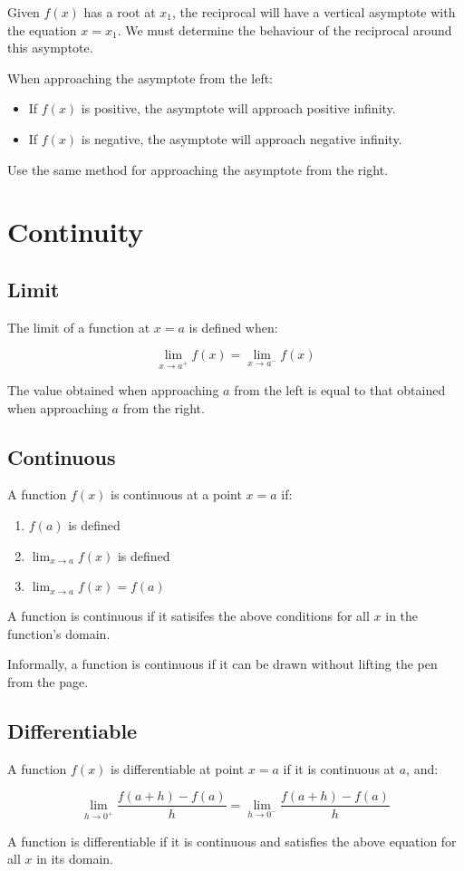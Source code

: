 \documentclass[a4paper,11pt]{article}
\begin{document}
Given $f(x)$ has a root at $x_1$, the reciprocal will have a vertical asymptote
with the equation $x = x_1$.
We must determine the behaviour of the reciprocal around this asymptote.

When approaching the asymptote from the left:

\begin{itemize}
\item If $f(x)$ is positive, the asymptote will approach positive infinity.
\item If $f(x)$ is negative, the asymptote will approach negative infinity.
\end{itemize}

Use the same method for approaching the asymptote from the right.




\section{Continuity}

\subsection{Limit}

The limit of a function at $x = a$ is defined when:

$$
\lim_{x \to a^+} f(x) = \lim_{x \to a^-} f(x)
$$

The value obtained when approaching $a$ from the left is equal to that obtained
when approaching $a$ from the right.


\subsection{Continuous}

A function $f(x)$ is continuous at a point $x = a$ if:

\begin{enumerate}
\item $f(a)$ is defined
\item $\lim_{x \to a} f(x)$ is defined
\item $\lim_{x \to a} f(x) = f(a)$
\end{enumerate}

A function is continuous if it satisifes the above conditions for all $x$ in
the function's domain.

Informally, a function is continuous if it can be drawn without lifting the pen
from the page.


\subsection{Differentiable}

A function $f(x)$ is differentiable at point $x = a$ if it is continuous at $a$,
and:

$$
\lim_{h \to 0^+} \frac{f(a + h) - f(a)}{h} = \lim_{h \to 0^-} \frac{f(a + h) - f(a)}{h}
$$

A function is differentiable if it is continuous and satisfies the above
equation for all $x$ in its domain.
\end{document}
